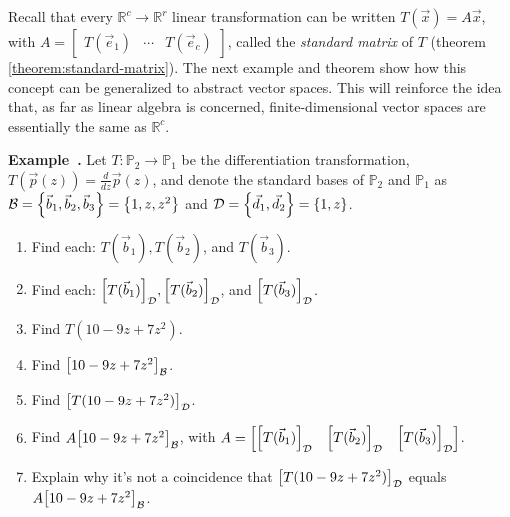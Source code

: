 \documentclass[11pt, letterpaper]{report}
\newenvironment{notes}{}{}
\let\originalleft\left
\let\originalright\right
\renewcommand{\left}{\mathopen{}\mathclose\bgroup\originalleft}
\renewcommand{\right}{\aftergroup\egroup\originalright}
\newcounter{example}[section]
\newcommand{\example}{\refstepcounter{example}%
\par\noindent\textbf{Example~\theexample.} }
\newcounter{theorem}[chapter]
\newcommand{\R}{\mathbb{R}}
\newcommand{\Poly}{\mathbb{P}}
\begin{document}
Recall  that every $\R^c \rightarrow \R^r$ linear transformation can be written $T(\vec{x})= A\vec{x}$, with $A = \begin{bmatrix}
T ( \vec{e}_1 ) & \cdots & T ( \vec{e}_c )
\end{bmatrix}$, called the \emph{standard matrix} of $T$ (theorem \ref{theorem:standard-matrix}). The next example and theorem show how this concept can be generalized to abstract vector spaces. This will reinforce the idea that, as far as linear algebra is concerned, finite-dimensional vector spaces are essentially the same as $\R^c$. 

\example {} Let $T:\Poly_2\rightarrow \Poly_1$ be the differentiation transformation, $T(\vec{p}(z)) = \frac{d}{dz}\vec{p}(z)$, and denote the standard bases of $\Poly_2$ and $\Poly_1$ as $\mathcal{B}= \left\{ \vec{b}_1,\vec{b}_2,\vec{b}_3 \right\} = \left\{ 1,z,z^2 \right\}$ and $\mathcal{D}= \left\{ \vec{d}_1,\vec{d}_2 \right\} = \left\{ 1,z \right\}$.
\begin{enumerate}[label=(\alph*)]
\item Find each: $T(\vec{b}_1),T(\vec{b}_2)$, and $T(\vec{b}_3)$.
\item Find each: $\left[ T(\vec{b}_1) \right]_{\mathcal{D}},\left[ T(\vec{b}_2) \right]_{\mathcal{D}}$, and $\left[ T(\vec{b}_3) \right]_{\mathcal{D}}$.
\item Find $T(10-9z+7z^2)$.
\item Find $\left[10-9z+7z^2\right]_{\mathcal{B}}$.
\item Find $\left[ T(10-9z+7z^2) \right]_{\mathcal{D}}$.
\item Find $A\left[10-9z+7z^2\right]_{\mathcal{B}}$, with $A = \begin{bmatrix}
\left[ T(\vec{b}_1) \right]_{\mathcal{D}} & \left[ T(\vec{b}_2) \right]_{\mathcal{D}} & \left[ T(\vec{b}_3) \right]_{\mathcal{D}}
\end{bmatrix}$.
\item Explain why it's not a coincidence that $\left[ T(10-9z+7z^2) \right]_{\mathcal{D}}$ equals $A \left[ 10-9z+7z^2 \right]_{\mathcal{B}}$.
\end{enumerate}

\begin{notes}
\vfill
\vfill
\vfill
\vfill
\vfill
\vfill
\newpage
\end{notes}
\end{document}
